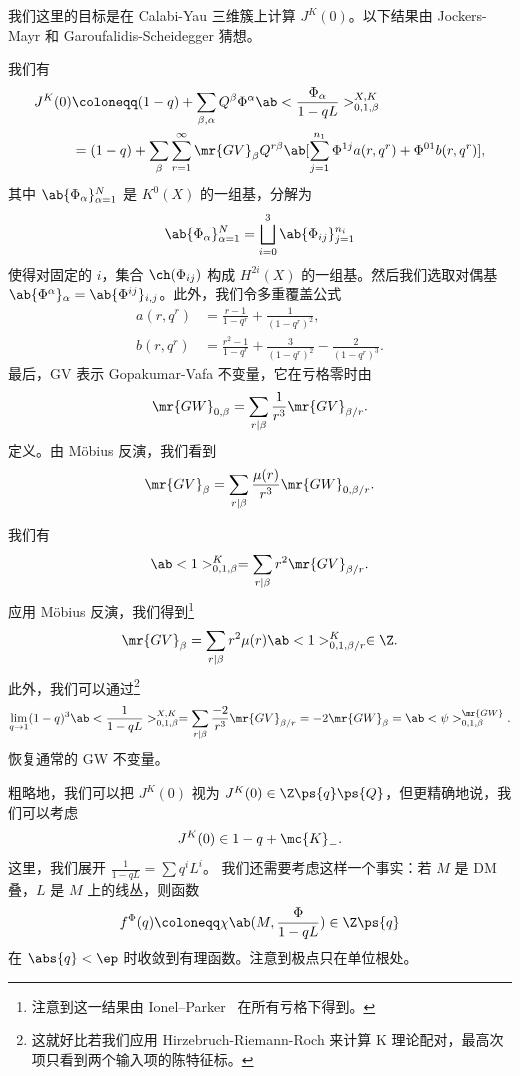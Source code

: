 我们这里的目标是在 Calabi-Yau 三维簇上计算 \(J^K(0)\)。以下结果由 Jockers-Mayr 和 Garoufalidis-Scheidegger 猜想。

\begin{thm}
    我们有
    \begin{align*}
        J^K(0) &\coloneqq (1-q) + \sum_{\beta, \alpha} Q^{\beta} \Phi^{\alpha} \ab<\frac{\Phi_{\alpha}}{1-qL}>_{0,1,\beta}^{X,K} \\
        &= (1-q) + \sum_{\beta} \sum_{r=1}^{\infty} \mr{GV}_{\beta} Q^{r\beta} \ab[\sum_{j=1}^{n_1} \Phi^{1j} a(r, q^r) + \Phi^{01} b(r, q^r)],
    \end{align*}
    其中 \(\ab\{\Phi_{\alpha}\}_{\alpha=1}^N\) 是 \(K^0(X)\) 的一组基，分解为
    \[ \ab\{\Phi_{\alpha}\}_{\alpha=1}^N = \bigsqcup_{i=0}^3 \ab\{\Phi_{ij}\}_{j=1}^{n_i} \]
    使得对固定的 \(i\)，集合 \(\ch(\Phi_{ij})\) 构成 \(H^{2i}(X)\) 的一组基。然后我们选取对偶基 \(\ab\{\Phi^{\alpha}\}_{\alpha} = \ab\{\Phi^{ij}\}_{i,j}\)。此外，我们令多重覆盖公式
    \begin{align*}
        a(r, q^r) &= \frac{r-1}{1-q^r} + \frac{1}{(1-q^r)^2}, \\
        b(r, q^r) &= \frac{r^2-1}{1-q^r} + \frac{3}{(1-q^r)^2} - \frac{2}{(1-q^r)^3}.
    \end{align*}
    最后，GV 表示 Gopakumar-Vafa 不变量，它在亏格零时由
    \[ \mr{GW}_{0,\beta} = \sum_{r \mid \beta} \frac{1}{r^3} \mr{GV}_{\beta/r}. \]
    定义。由 M\"obius 反演，我们看到
    \[ \mr{GV}_{\beta} = \sum_{r \mid \beta} \frac{\mu(r)}{r^3} \mr{GW}_{0,\beta/r}. \]
\end{thm}

\begin{cor}
    我们有
    \[ \ab<1>_{0,1,\beta}^K = \sum_{r \mid \beta} r^2 \mr{GV}_{\beta/r}. \]
    应用 M\"obius 反演，我们得到\footnote{注意到这一结果由 Ionel--Parker~\cite{IonelParker2018} 在所有亏格下得到。}
    \[ \mr{GV}_{\beta} = \sum_{r \mid \beta} r^2 \mu(r) \ab<1>_{0,1,\beta/r}^K \in \Z. \]
    此外，我们可以通过\footnote{这就好比若我们应用 Hirzebruch-Riemann-Roch 来计算 K 理论配对，最高次项只看到两个输入项的陈特征标。}
    \[ \lim_{q \to 1} (1-q)^3 \ab<\frac{1}{1-qL}>_{0,1,\beta}^{X,K} = \sum_{r \mid \beta} \frac{-2}{r^3} \mr{GV}_{\beta/r} = -2 \mr{GW}_{\beta} = \ab<\psi>_{0,1,\beta}^{\mr{GW}}. \]
    恢复通常的 GW 不变量。
\end{cor}

粗略地，我们可以把 \(J^K(0)\) 视为 \(J^K(0) \in \Z\ps{q}\ps{Q}\)，但更精确地说，我们可以考虑
\[ J^K(0) \in 1-q + \mc{K}_-. \]
这里，我们展开 \(\frac{1}{1-qL} = \sum q^i L^i\)。 
我们还需要考虑这样一个事实：若 \(M\) 是 DM叠，\(L\) 是 \(M\) 上的线丛，则函数
\[ f^{\Phi}(q) \coloneqq \chi\ab(M, \frac{\Phi}{1-qL}) \in \Z \ps{q} \]
在 \(\abs{q} < \ep\) 时收敛到有理函数。注意到极点只在单位根处。

